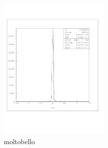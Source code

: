 \documentclass[a4paper]{article}
\begin{document}
\begin{figure}[!htb]
  \includegraphics[width=0.49\textwidth]{ex_images/1_050_140_xs.jpg}
  \caption{moltobello}
  \label{fig:050_xs}
\end{figure}
\end{document}

